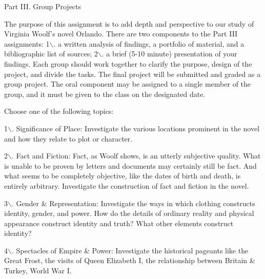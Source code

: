 \documentclass[11pt]{article}
\begin{document}
Part III. Group Projects

The purpose of this assignment is to add depth and perspective to our study of Virginia Woolf's novel Orlando. There are two components to the Part III assignments: 1$\backslash$. a written analysis of findings, a portfolio of material, and a bibliographic list of sources; 2$\backslash$. a brief (5-10 minute) presentation of your findings. Each group should work together to clarify the purpose, design of the project, and divide the tasks. The final project will be submitted and graded as a group project. The oral component may be assigned to a single member of the group, and it must be given to the class on the designated date.

Choose one of the following topics:

1$\backslash$. Significance of Place: Investigate the various locations prominent in the novel and how they relate to plot or character.

2$\backslash$. Fact and Fiction: Fact, as Woolf shows, is an utterly subjective quality. What is unable to be proven by letters and documents may certainly still be fact. And what seems to be completely objective, like the dates of birth and death, is entirely arbitrary. Investigate the construction of fact and fiction in the novel. 

3$\backslash$. Gender \& Representation: Investigate the ways in which clothing constructs identity, gender, and power. How do the details of ordinary reality and physical appearance construct identity and truth? What other elements construct identity?

4$\backslash$. Spectacles of Empire \& Power: Investigate the historical pageants like the Great Frost, the visits of Queen Elizabeth I, the relationship between Britain \& Turkey, World War I.
\end{document}
